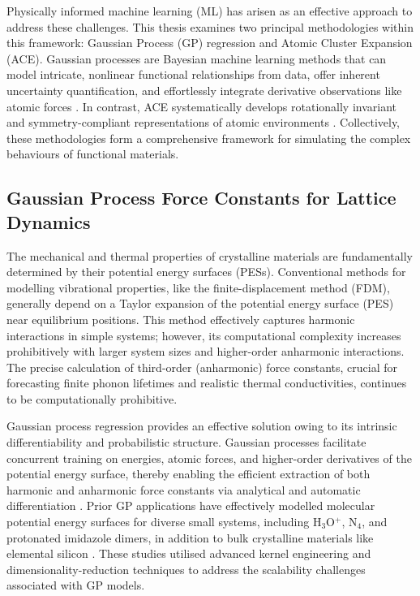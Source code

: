 Physically informed machine learning (ML) has arisen as an effective approach to address these challenges. This thesis examines two principal methodologies within this framework: Gaussian Process (GP) regression and Atomic Cluster Expansion (ACE).  Gaussian processes are Bayesian machine learning methods that can model intricate, nonlinear functional relationships from data, offer inherent uncertainty quantification, and effortlessly integrate derivative observations like atomic forces \cite{RasmussenW06, Bartk2015, Bartk2017}.  In contrast, ACE systematically develops rotationally invariant and symmetry-compliant representations of atomic environments \cite{Drautz2019, Dusson2022}.  Collectively, these methodologies form a comprehensive framework for simulating the complex behaviours of functional materials.

\subsection{Gaussian Process Force Constants for Lattice Dynamics}

The mechanical and thermal properties of crystalline materials are fundamentally determined by their potential energy surfaces (PESs).  Conventional methods for modelling vibrational properties, like the finite-displacement method (FDM), generally depend on a Taylor expansion of the potential energy surface (PES) near equilibrium positions.  This method effectively captures harmonic interactions in simple systems; however, its computational complexity increases prohibitively with larger system sizes and higher-order anharmonic interactions.  The precise calculation of third-order (anharmonic) force constants, crucial for forecasting finite phonon lifetimes and realistic thermal conductivities, continues to be computationally prohibitive.

Gaussian process regression provides an effective solution owing to its intrinsic differentiability and probabilistic structure.  Gaussian processes facilitate concurrent training on energies, atomic forces, and higher-order derivatives of the potential energy surface, thereby enabling the efficient extraction of both harmonic and anharmonic force constants via analytical and automatic differentiation \cite{Solak2002, Dai2020}.  Prior GP applications have effectively modelled molecular potential energy surfaces for diverse small systems, including H$_3$O$^+$, N$_4$, and protonated imidazole dimers, in addition to bulk crystalline materials like elemental silicon \cite{Handley2009, Cui2016, Sugisawa2020, Bartk2018}.  These studies utilised advanced kernel engineering and dimensionality-reduction techniques to address the scalability challenges associated with GP models.

